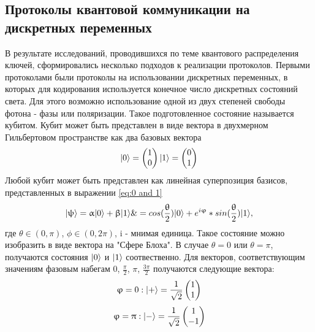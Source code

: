 \subsection{Протоколы квантовой коммуникации на дискретных переменных }\label{sec:ch1/sect2/DVQKD prot}
 В результате исследований, проводившихся по теме квантового распределения ключей, сформировались несколько подходов к реализации протоколов. Первыми протоколами были протоколы на использовании дискретных переменных, в которых для кодирования  используется конечное число дискретных состояний света. Для этого возможно использование одной из двух степеней свободы фотона - фазы или поляризации. Такое подготовленное состояние называется кубитом. Кубит может быть представлен в виде вектора в двухмерном Гильбертовом пространстве как два базовых вектора
\begin{equation}
  \lvert0\rangle       =  \begin{pmatrix} 1 \\ 0 \end{pmatrix}
  \lvert1\rangle       =  \begin{pmatrix} 0 \\ 1 \end{pmatrix}
\end{equation}\label{eq:0 and 1}
Любой кубит может быть представлен как линейная суперпозиция базисов, представленных в выражении \ref{eq:0 and 1}
\begin{equation}
    \lvert\uppsi\rangle      = \upalpha\lvert0\rangle + \upbeta\lvert1\rangle \&=  cos(\frac{\uptheta}{2})\lvert0\rangle + e^{i\upvarphi} * sin(\frac{\uptheta}{2})\lvert1\rangle, 
\end{equation}\label{eq: superpos}
где $\theta \in (0, \pi)$, $\phi \in (0, 2\pi)$, i - мнимая единица. Такое состояние можно изобразить в виде вектора на "Сфере Блоха". В случае $\theta = 0 $ или $\theta = \pi $, получаются состояния $\lvert0\rangle$ и $\lvert1\rangle$ соотвественно. Для векторов, соответствующим значениям фазовым набегам {0, $\frac{\pi}{2}$, $\pi$, $\frac{3\pi}{2}$} получаются следующие вектора:
\begin{equation}
  \upvarphi = 0 : \lvert+\rangle= \frac{1}{\sqrt{2}} \begin{pmatrix} 1 \\ 1 \end{pmatrix}
\end{equation}\label{eq:0 phase vector}
\begin{equation}
  \upvarphi = \uppi : \lvert-\rangle= \frac{1}{\sqrt{2}} \begin{pmatrix} 1 \\ -1 \end{pmatrix}
\end{equation}\label{eq:pi phase vector}
